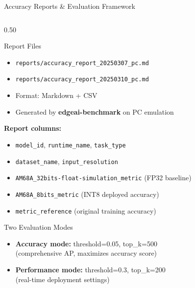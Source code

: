 \documentclass[aspectratio=169,12pt]{beamer}
\begin{document}
\begin{frame}{Accuracy Reports \& Evaluation Framework}
  \begin{columns}[T]
    \begin{column}{0.50\textwidth}
      \begin{block}{Report Files}
        \begin{itemize}\footnotesize
          \item \texttt{reports/accuracy\_report\_20250307\_pc.md}
          \item \texttt{reports/accuracy\_report\_20250310\_pc.md}
          \item Format: Markdown + CSV
          \item Generated by \textbf{edgeai-benchmark} on PC emulation
        \end{itemize}
      \end{block}

      \vspace{0.3cm}
      \textbf{Report columns:}
      \begin{itemize}\scriptsize
        \item \texttt{model\_id}, \texttt{runtime\_name}, \texttt{task\_type}
        \item \texttt{dataset\_name}, \texttt{input\_resolution}
        \item \texttt{AM68A\_32bits-float-simulation\_metric} (FP32 baseline)
        \item \texttt{AM68A\_8bits\_metric} (INT8 deployed accuracy)
        \item \texttt{metric\_reference} (original training accuracy)
      \end{itemize}

      \vspace{0.3cm}
      \begin{alertblock}{Two Evaluation Modes}
        \begin{itemize}\scriptsize
          \item \textbf{Accuracy mode:} threshold=0.05, top\_k=500\\
                (comprehensive AP, maximizes accuracy score)
          \item \textbf{Performance mode:} threshold=0.3, top\_k=200\\
                (real-time deployment settings)
        \end{itemize}
      \end{alertblock}
    \end{column}


\end{columns}
\end{frame}
\end{document}
